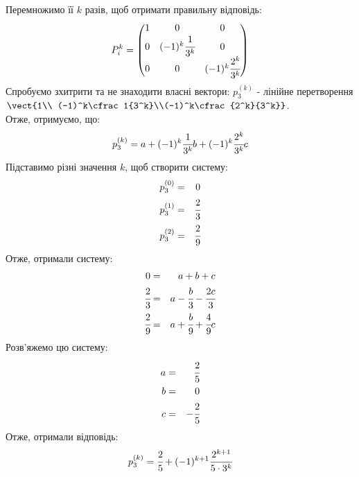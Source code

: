 \begin{exs}
Перемножимо її $k$ разів, щоб отримати правильну відповідь:
\begin{equation*}
P_i^k = \begin{pmatrix}
1 & 0 & 0\\
0 & (-1)^k\cfrac1{3^k} & 0 \\
0 & 0 & (-1)^k\cfrac{2^k}{3^k}
\end{pmatrix}
\end{equation*}
Спробуємо зхитрити та не знаходити власні вектори: $p_3^{(k)}$ - лінійне перетворення $\vect{1\\ (-1)^k\cfrac1{3^k}\\(-1)^k\cfrac{2^k}{3^k}}$.\\
Отже, отримуємо, що:
\begin{equation*}
p_3^{(k)} = a+ (-1)^k\cfrac1{3^k}b +(-1)^k\cfrac{2^k}{3^k}c
\end{equation*}
Підставимо різні значення $k$, щоб створити систему: 
\begin{eqnarray}
p_3^{(0)} &=& 0\\
p_3^{(1)} &=& \cfrac23\\
p_3^{(2)} &=& \cfrac29
\end{eqnarray}
Отже, отримали систему:
\begin{eqnarray}
0 &=& a + b + c\\
\cfrac23 &=& a - \cfrac b3 - \cfrac{2c}3\\
\cfrac29 &=& a + \cfrac b9 + \cfrac49 c
\end{eqnarray}
Розв’яжемо цю систему:
\begin{eqnarray}
a&=& \cfrac25\\
b&=& 0\\
c&=& -\cfrac25\\
\end{eqnarray}
Отже, отримали відповідь:
\begin{equation*}
p_3^{(k)} = \cfrac25  +(-1)^{k+1}\cfrac{2^{k+1}}{5\cdot 3^k}
\end{equation*}
\end{exs}